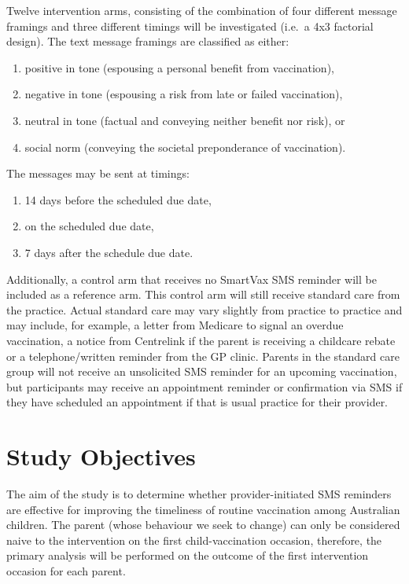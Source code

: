 \documentclass[
  bibliography=totoc]{scrreprt}
\providecommand{\tightlist}{%
  \setlength{\itemsep}{0pt}\setlength{\parskip}{0pt}}
\begin{document}
Twelve intervention arms, consisting of the combination of four different message framings and three different timings will be investigated (i.e.~a 4x3 factorial design).
The text message framings are classified as either:

\begin{enumerate}
\def\labelenumi{\arabic{enumi}.}
\tightlist
\item
  positive in tone (espousing a personal benefit from vaccination),
\item
  negative in tone (espousing a risk from late or failed vaccination),
\item
  neutral in tone (factual and conveying neither benefit nor risk), or
\item
  social norm (conveying the societal preponderance of vaccination).
\end{enumerate}

The messages may be sent at timings:

\begin{enumerate}
\def\labelenumi{\arabic{enumi}.}
\tightlist
\item
  14 days before the scheduled due date,
\item
  on the scheduled due date,
\item
  7 days after the schedule due date.
\end{enumerate}

Additionally, a control arm that receives no SmartVax SMS reminder will be included as a reference arm.
This control arm will still receive standard care from the practice.
Actual standard care may vary slightly from practice to practice and may include, for example, a letter from Medicare to signal an overdue vaccination, a notice from Centrelink if the parent is receiving a childcare rebate or a telephone/written reminder from the GP clinic.
Parents in the standard care group will not receive an unsolicited SMS reminder for an upcoming vaccination, but participants may receive an appointment reminder or confirmation via SMS if they have scheduled an appointment if that is usual practice for their provider.

\hypertarget{study-objectives}{%
\section{Study Objectives}\label{study-objectives}}

The aim of the study is to determine whether provider-initiated SMS reminders are effective for improving the timeliness of routine vaccination among Australian children.
The parent (whose behaviour we seek to change) can only be considered naive to the intervention on the first child-vaccination occasion, therefore, the primary analysis will be performed on the outcome of the first intervention occasion for each parent.
\end{document}
